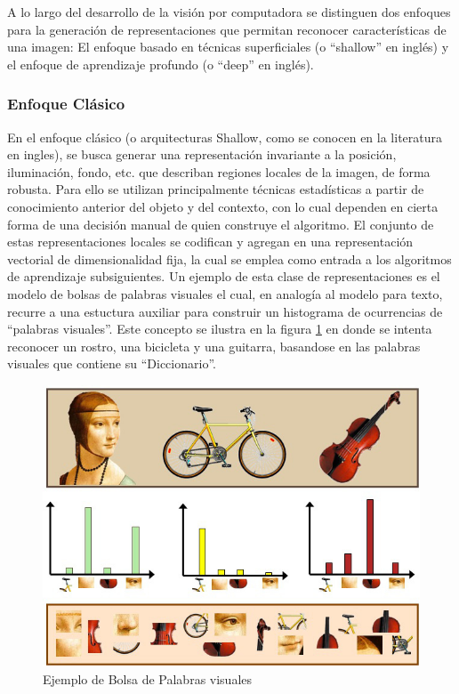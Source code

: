 \documentclass[a4paper,11pt,spanish]{book}
\begin{document}
      A lo largo del desarrollo de la visión por computadora se distinguen dos enfoques para la generación de representaciones que permitan reconocer características de una imagen:
      El enfoque basado en técnicas superficiales (o “shallow” en inglés) y el enfoque de aprendizaje profundo (o “deep” en inglés).

      \subsubsection{Enfoque Clásico}
	En el enfoque clásico (o arquitecturas Shallow, como se conocen en la literatura en ingles), se busca generar una representación invariante a la posición, iluminación, fondo, etc.
	que describan regiones locales de la imagen, de forma robusta. Para ello se utilizan principalmente técnicas estadísticas a partir de conocimiento anterior del objeto y del contexto,
	con lo cual dependen en cierta forma de una decisión manual de quien construye el algoritmo.
	El conjunto de estas representaciones locales se codifican y agregan en una representación vectorial de dimensionalidad fija, la cual se emplea como
        entrada a los algoritmos de aprendizaje subsiguientes. Un ejemplo de esta clase de representaciones es el modelo de bolsas de palabras
        visuales el cual, en analogía al modelo para texto, recurre a una estuctura auxiliar para construir un histograma de ocurrencias de
        ``palabras visuales''. Este concepto se ilustra en la figura \ref{fig:bovw} en donde se intenta reconocer un rostro,
	una bicicleta y una guitarra, basandose en las palabras visuales que contiene su ``Diccionario''.

	\begin{figure}[h]
	  \begin{center}
	    \includegraphics[scale=0.5]{./img/bag_of_visual_words.jpg}
	    \caption{Ejemplo de Bolsa de Palabras visuales}
	    \label{fig:bovw}
	  \end{center}
	\end{figure}
\end{document}
